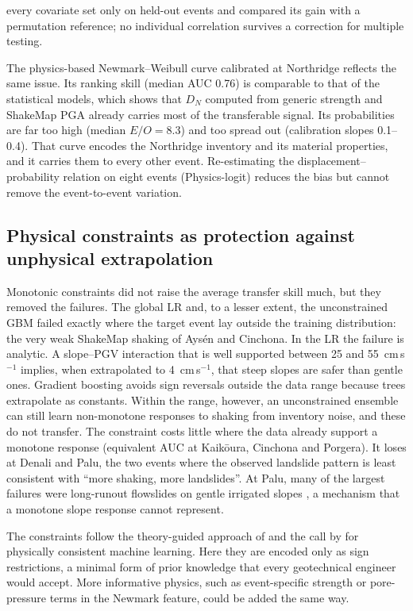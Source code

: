 every covariate set only on held-out events and compared its gain with a permutation reference; no individual correlation survives a correction for multiple testing.

The physics-based Newmark--Weibull curve calibrated at Northridge \citep{jibson2000} reflects the same issue. Its ranking skill (median AUC 0.76) is comparable to that of the statistical models, which shows that $D_N$ computed from generic strength and ShakeMap PGA already carries most of the transferable signal. Its probabilities are far too high (median $E/O=8.3$) and too spread out (calibration slopes 0.1--0.4). That curve encodes the Northridge inventory and its material properties, and it carries them to every other event. Re-estimating the displacement--probability relation on eight events (Physics-logit) reduces the bias but cannot remove the event-to-event variation.

\subsection{Physical constraints as protection against unphysical extrapolation}
Monotonic constraints did not raise the average transfer skill much, but they removed the failures. The global LR and, to a lesser extent, the unconstrained GBM failed exactly where the target event lay outside the training distribution: the very weak ShakeMap shaking of Ays\'en and Cinchona. In the LR the failure is analytic. A slope--PGV interaction that is well supported between 25 and 55~cm\,s$^{-1}$ implies, when extrapolated to 4~cm\,s$^{-1}$, that steep slopes are safer than gentle ones. Gradient boosting avoids sign reversals outside the data range because trees extrapolate as constants. Within the range, however, an unconstrained ensemble can still learn non-monotone responses to shaking from inventory noise, and these do not transfer. The constraint costs little where the data already support a monotone response (equivalent AUC at Kaik\={o}ura, Cinchona and Porgera). It loses at Denali and Palu, the two events where the observed landslide pattern is least consistent with ``more shaking, more landslides''. At Palu, many of the largest failures were long-runout flowslides on gentle irrigated slopes \citep{bradley2019palu}, a mechanism that a monotone slope response cannot represent.

The constraints follow the theory-guided approach of \citet{karpatne2017} and the call by \citet{reichstein2019} for physically consistent machine learning. Here they are encoded only as sign restrictions, a minimal form of prior knowledge that every geotechnical engineer would accept. More informative physics, such as event-specific strength or pore-pressure terms in the Newmark feature, could be added the same way.

